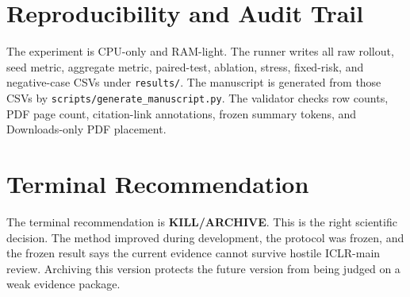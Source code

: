 \documentclass{article}
\begin{document}
\section{Reproducibility and Audit Trail}
The experiment is CPU-only and RAM-light. The runner writes all raw rollout, seed metric, aggregate metric, paired-test, ablation, stress, fixed-risk, and negative-case CSVs under \texttt{results/}. The manuscript is generated from those CSVs by \texttt{scripts/generate\_manuscript.py}. The validator checks row counts, PDF page count, citation-link annotations, frozen summary tokens, and Downloads-only PDF placement.

\section{Terminal Recommendation}
The terminal recommendation is \textbf{KILL/ARCHIVE}. This is the right scientific decision. The method improved during development, the protocol was frozen, and the frozen result says the current evidence cannot survive hostile ICLR-main review. Archiving this version protects the future version from being judged on a weak evidence package.

\clearpage
\appendix
\end{document}
